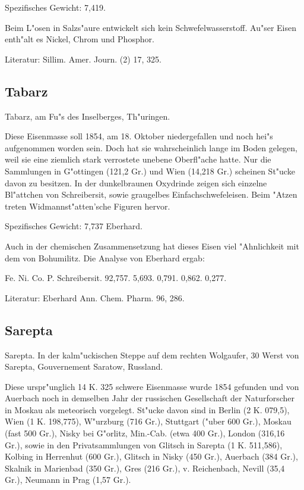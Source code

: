 \documentclass[a4paper, 11pt, oneside]{article}
\begin{document}
Spezifisches Gewicht: 7,419.

Beim L"osen in Salzs"aure entwickelt sich kein Schwefelwasserstoff. Au"ser Eisen enth"alt es Nickel, Chrom und Phosphor.

Literatur: Sillim. Amer. Journ. (2) 17, 325.

\subsection{Tabarz}

Tabarz, am Fu"s des Inselberges, Th"uringen.

Diese Eisenmasse soll 1854, am 18. Oktober niedergefallen und noch hei"s aufgenommen worden sein. Doch hat sie wahrscheinlich lange im Boden gelegen, weil sie eine ziemlich stark verrostete unebene Oberfl"ache hatte. Nur die Sammlungen in G"ottingen (121,2 Gr.) und Wien (14,218 Gr.) scheinen St"ucke davon zu besitzen. In der dunkelbraunen Oxydrinde zeigen sich einzelne Bl"attchen von Schreibersit, sowie graugelbes Einfachschwefeleisen. Beim "Atzen treten Widmannst"atten'sche Figuren hervor.

Spezifisches Gewicht: 7,737 Eberhard.

Auch in der chemischen Zusammensetzung hat dieses Eisen viel "Ahnlichkeit mit dem von Bohumilitz. Die Analyse von Eberhard ergab:

Fe. Ni. Co. P. Schreibersit.  
92,757. 5,693. 0,791. 0,862. 0,277.

Literatur: Eberhard Ann. Chem. Pharm. 96, 286.

\subsection{Sarepta}

Sarepta. In der kalm"uckischen Steppe auf dem rechten Wolgaufer, 30 Werst von Sarepta, Gouvernement Saratow, Russland.

Diese urspr"unglich 14 K. 325 schwere Eisenmasse wurde 1854 gefunden und von Auerbach noch in demselben Jahr der russischen Gesellschaft der Naturforscher in Moskau als meteorisch vorgelegt. St"ucke davon sind in Berlin (2 K. 079,5), Wien (1 K. 198,775), W"urzburg (716 Gr.), Stuttgart ("uber 600 Gr.), Moskau (fast 500 Gr.), Nisky bei G"orlitz, Min.-Cab. (etwa 400 Gr.), London (316,16 Gr.), sowie in den Privatsammlungen von Glitsch in Sarepta (1 K. 511,586), Kolbing in Herrenhut (600 Gr.), Glitsch in Nisky (450 Gr.), Auerbach (384 Gr.), Skalnik in Marienbad (350 Gr.), Gres (216 Gr.), v. Reichenbach, Nevill (35,4 Gr.), Neumann in Prag (1,57 Gr.).
\end{document}
